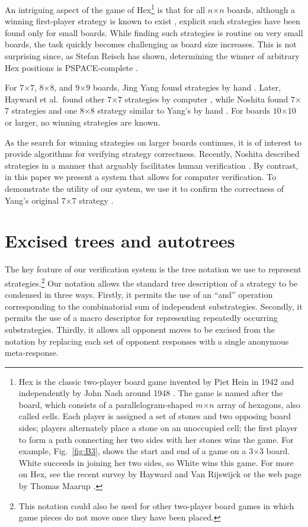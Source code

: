 \documentclass{llncs}
\def\at{autotree}
\newcommand{\board}[2]{\mbox{$#1$$\times$$#2$}}
\begin{document}
An intriguing aspect of the game of Hex\footnote{
  Hex is the classic two-player board game invented by Piet Hein in
  1942 and independently by John Nash around 1948 
  \cite{Nash52,Gardner57,Gardner59,Maarup05,Maarup05w,Nasar98}.
  The game is named after the board,
  which consists of a parallelogram-shaped $m$$\times$$n$ array of
  hexagons, also called cells. 
  Each player is assigned a set of
  stones and two opposing board sides;
  players alternately place a stone on an unoccupied cell; 
  the first player to form a path connecting her two sides
  with her stones wins the game.
  For example,  Fig.~\ref{fig:B3},
  shows the start and end of a game on a \board{3}{3} board.
  White succeeds in joining her two sides, so White wins this game.
  For more on Hex, see the recent survey by 
  Hayward and Van Rijswijck \cite{HaywardvanR05}
  or the web page by Thomas Maarup \cite{Maarup05w}.}
is that for all \board{n}{n} boards,
although a winning first-player strategy is known to exist
\cite{Nash52,Gardner57,Gardner59},
explicit such strategies have been found only for small boards.
While finding such strategies is routine on very small boards,
the task quickly becomes challenging as board size increases.
This is not surprising since, as Stefan Reisch has shown, 
determining the winner of arbitrary Hex positions is PSPACE-complete
\cite{Reisch81}.

For \board{7}{7}, \board{8}{8}, and \board{9}{9} boards,
Jing Yang found strategies by hand \cite{Yang01,Yang02a,Yang02b,Yang03}.
Later, Hayward et al.~found other \board{7}{7} strategies by computer 
\cite{HaywardEtAl03,HaywardEtAl05},
while Noshita found \board{7}{7} strategies
and one \board{8}{8} strategy similar to Yang's by hand \cite{Noshita05}.
For boards \board{10}{10} or larger, no winning strategies are known.

As the search for winning strategies on larger boards continues,
it is of interest to provide algorithms 
for verifying strategy correctness.
Recently, Noshita described strategies in a manner 
that arguably facilitates human verification \cite{Noshita05}.
By contrast, in this paper we present 
a system that allows for computer verification.
To demonstrate the utility of our system, we use it to
confirm the correctness of Yang's original \board{7}{7} strategy \cite{Yang01}.

\section{Excised trees and \at s}
The key feature of our verification system is
the tree notation we use to represent strategies.\footnote{This 
  notation could also be used for other two-player board games
  in which game pieces do not move once they have been placed.}
Our notation allows the standard tree description 
of a strategy to be condensed in three ways.
Firstly, it permits the use of an ``and'' operation
corresponding to the combinatorial sum of independent substrategies.
Secondly, it permits the use of a macro descriptor for representing
repeatedly occurring substrategies.
Thirdly, it allows 
all opponent moves to be excised from the notation by replacing 
each set of opponent responses with a single anonymous meta-response.
\end{document}
